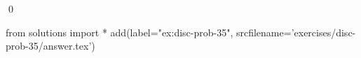 
\begin{ex} 
  \label{ex:disc-prob-35}
  
  \qed
\end{ex} 
\begin{python0}
from solutions import *
add(label="ex:disc-prob-35",
    srcfilename='exercises/disc-prob-35/answer.tex') 
\end{python0}
